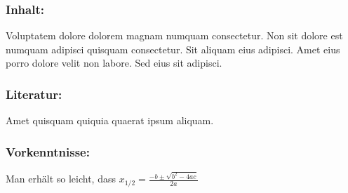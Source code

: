 \subsubsection*{\Large Inhalt:}
Voluptatem dolore dolorem magnam numquam consectetur. Non sit dolore est numquam adipisci quisquam consectetur. Sit aliquam eius adipisci. Amet eius porro dolore velit non labore. Sed eius sit adipisci.
\subsubsection*{\Large Literatur:}
Amet quisquam quiquia quaerat ipsum aliquam.
\subsubsection*{\Large Vorkenntnisse:}
Man erhält so leicht, dass $x_{1/2} = \frac{-b \pm \sqrt{b^2 - 4ac}}{2a}$
